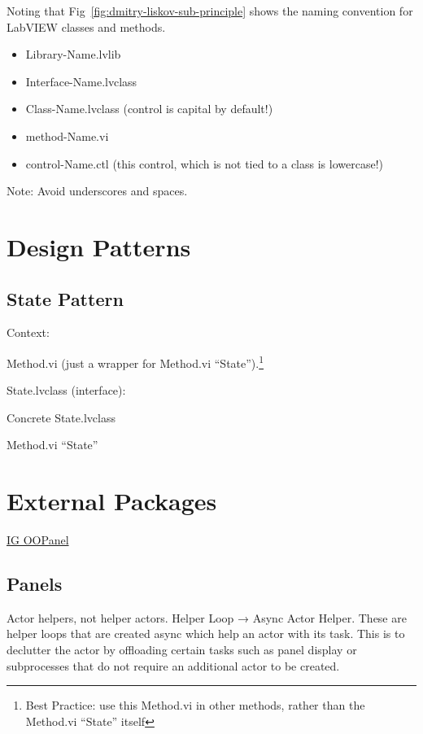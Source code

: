 \documentclass{article}
\begin{document}
Noting that Fig~\ref{fig:dmitry-liskov-sub-principle} shows the naming convention for LabVIEW classes and methods.
\begin{itemize}
    \item{Library-Name.lvlib}
    \item{Interface-Name.lvclass}
    \item{Class-Name.lvclass (control is capital by default!)}
    \item{method-Name.vi}
    \item{control-Name.ctl (this control, which is not tied to a class is lowercase!)}
\end{itemize}

\noindent Note: Avoid underscores and spaces.

\section{Design Patterns}
\label{sec:design-patterns}

\subsection{State Pattern}
\label{subsec:state-pattern}

\noindent Context:

\quad Method.vi (just a wrapper for Method.vi “State”).\footnote{Best Practice: use this Method.vi in other methods, rather than the Method.vi “State” itself}

\noindent State.lvclass (interface):

\quad Concrete State.lvclass

\quad Method.vi “State”

\section{External Packages}
\label{sec:external-packages}

\href{https://www.vipm.io/package/illuminatedg_lib_ig_oopanel/}{IG OOPanel}

\subsection{Panels}
\label{subsec:panels}

Actor helpers, not helper actors.
Helper Loop → Async Actor Helper.
These are helper loops that are created async which help an actor with its task.
This is to declutter the actor by offloading certain tasks such as panel display or subprocesses that do not require an additional actor to be created.
\end{document}
